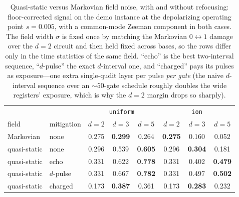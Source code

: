 \documentclass[aps,pra,reprint,superscriptaddress,nofootinbib,floatfix]{revtex4-2}
\begin{document}
\squeezetable
\begin{table}[t]
\caption{Quasi-static versus Markovian field noise, with and without
refocusing: floor-corrected signal on the demo instance at the
depolarizing operating point $s=0.005$, with a common-mode Zeeman
component in both cases. The field width $\sigma$ is fixed once by
matching the Markovian $0{\leftrightarrow}1$ damage over the $d=2$
circuit and then held fixed across bases, so the rows differ only in
the time statistics of the same field. ``echo'' is the best
two-interval sequence, ``$d$-pulse'' the exact $d$-interval one, and
``charged'' pays its pulses as exposure---one extra single-qudit
layer per pulse \emph{per gate} (the naive $d$-interval sequence over
an ${\sim}50$-gate schedule roughly doubles the wide registers'
exposure, which is why the $d=2$ margin drops so sharply).}
\label{tab:quasistatic}
\begin{ruledtabular}
\begin{tabular}{llccc|ccc}
 & & \multicolumn{3}{c|}{\texttt{uniform}} & \multicolumn{3}{c}{\texttt{ion}} \\
field & mitigation & $d{=}2$ & $d{=}3$ & $d{=}5$ & $d{=}2$ & $d{=}3$ & $d{=}5$ \\
\hline
Markovian     & none      & 0.275 & \textbf{0.299} & 0.264 & \textbf{0.275} & 0.160 & 0.052 \\
quasi-static  & none      & 0.296 & 0.539 & \textbf{0.605} & 0.296 & \textbf{0.304} & 0.181 \\
quasi-static  & echo      & 0.331 & 0.622 & \textbf{0.778} & 0.331 & 0.402 & \textbf{0.479} \\
quasi-static  & $d$-pulse & 0.331 & 0.667 & \textbf{0.782} & 0.331 & 0.497 & \textbf{0.502} \\
quasi-static  & charged   & 0.173 & \textbf{0.387} & 0.361 & 0.173 & \textbf{0.283} & 0.232 \\
\end{tabular}
\end{ruledtabular}
\end{table}
\end{document}
